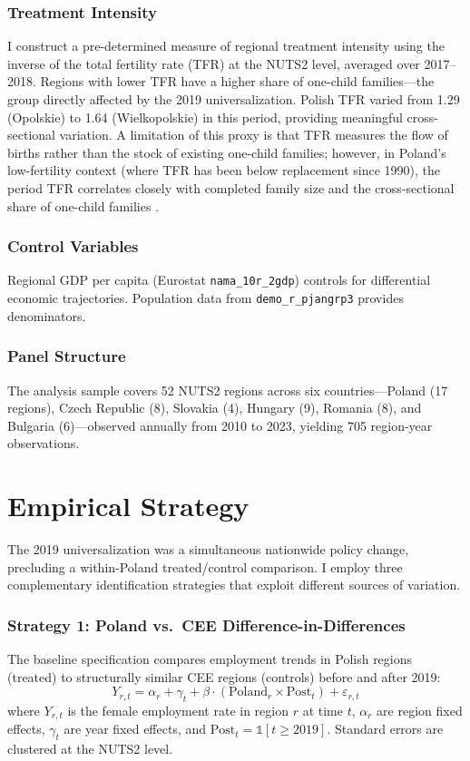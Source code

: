 \documentclass[12pt]{article}
\begin{document}
\subsubsection*{Treatment Intensity}  I construct a pre-determined measure of regional treatment intensity using the inverse of the total fertility rate (TFR) at the NUTS2 level, averaged over 2017--2018. Regions with lower TFR have a higher share of one-child families---the group directly affected by the 2019 universalization. Polish TFR varied from 1.29 (Opolskie) to 1.64 (Wielkopolskie) in this period, providing meaningful cross-sectional variation. A limitation of this proxy is that TFR measures the flow of births rather than the stock of existing one-child families; however, in Poland's low-fertility context (where TFR has been below replacement since 1990), the period TFR correlates closely with completed family size and the cross-sectional share of one-child families \citep{riphahn2017}.

\subsubsection*{Control Variables}  Regional GDP per capita (Eurostat \texttt{nama\_10r\_2gdp}) controls for differential economic trajectories. Population data from \texttt{demo\_r\_pjangrp3} provides denominators.

\subsubsection*{Panel Structure}  The analysis sample covers 52 NUTS2 regions across six countries---Poland (17 regions), Czech Republic (8), Slovakia (4), Hungary (9), Romania (8), and Bulgaria (6)---observed annually from 2010 to 2023, yielding 705 region-year observations.




\section{Empirical Strategy}

The 2019 universalization was a simultaneous nationwide policy change, precluding a within-Poland treated/control comparison. I employ three complementary identification strategies that exploit different sources of variation.

\subsubsection*{Strategy 1: Poland vs.\ CEE Difference-in-Differences}  The baseline specification compares employment trends in Polish regions (treated) to structurally similar CEE regions (controls) before and after 2019:
\begin{equation}
Y_{r,t} = \alpha_r + \gamma_t + \beta \cdot (\text{Poland}_r \times \text{Post}_t) + \varepsilon_{r,t}
\label{eq:did}
\end{equation}
where $Y_{r,t}$ is the female employment rate in region $r$ at time $t$, $\alpha_r$ are region fixed effects, $\gamma_t$ are year fixed effects, and $\text{Post}_t = \mathbb{1}[t \geq 2019]$. Standard errors are clustered at the NUTS2 level.
\end{document}
